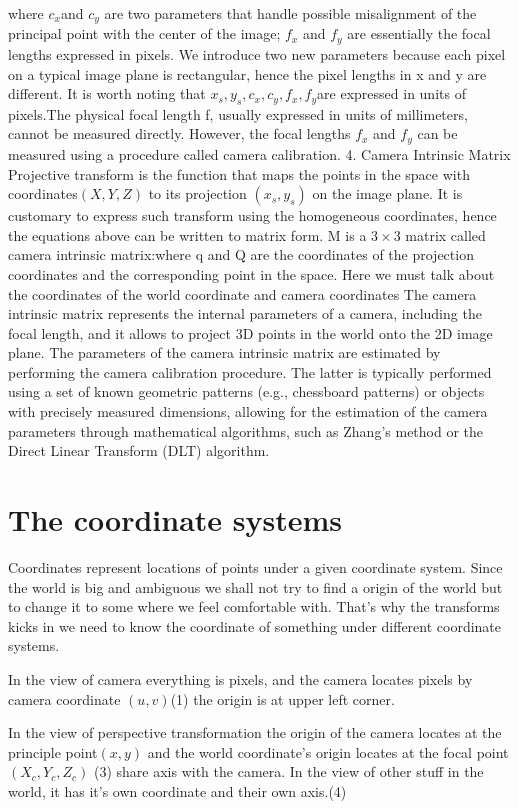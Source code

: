 \documentclass{article}
\begin{document}
where $c_x$and $c_y$
are two parameters that handle possible misalignment of the principal point with the center of the image; $f_x$ and $f_y$
are essentially the focal lengths expressed in pixels. We introduce two new parameters because each pixel on a typical image plane is rectangular, hence the pixel lengths in x and y are different. It is worth noting that $x_s,y_s,c_x,c_y,f_x,f_y$are expressed in units of pixels.The physical focal length f, usually expressed in units of millimeters, cannot be measured directly. However, the focal lengths $f_x$ and $f_y$ can be measured using a procedure called camera calibration.
4. Camera Intrinsic Matrix
Projective transform is the function that maps the points in the space with coordinates$(X, Y, Z)$ to its projection $(x_s, y_s)$ on the image plane. It is customary to express such transform using the homogeneous coordinates, hence the equations above can be written to matrix form.
M is a $3\times3$ matrix called camera intrinsic matrix:where q and Q are the coordinates of the projection coordinates  and the corresponding point in the space.
Here we must talk about the coordinates of the world coordinate and camera coordinates
The camera intrinsic matrix represents the internal parameters of a camera, including the focal length, and it allows to project 3D points in the world onto the 2D image plane.
The parameters of the camera intrinsic matrix are estimated by performing the camera calibration procedure. The latter is typically performed using a set of known geometric patterns (e.g., chessboard patterns) or objects with precisely measured dimensions, allowing for the estimation of the camera parameters through mathematical algorithms, such as Zhang's method or the Direct Linear Transform (DLT) algorithm.
\section{The coordinate systems}
Coordinates represent locations of points under a given coordinate system. Since the world is big and ambiguous we shall not try to find a origin of the world but to change it to some where we feel comfortable with. That's why the transforms kicks in we need to know the coordinate of something under different coordinate systems.

In the view of camera everything is pixels, and the camera locates pixels by camera coordinate $(u,v)$(1) the origin is at upper left corner.

In the view of perspective transformation the origin of the camera locates at the principle
point$(x,y)$ and the world coordinate's origin locates at the focal point$(X_c,Y_c,Z_c)$ (3) share axis with the camera.
In the view of other stuff in the world, it has it's own coordinate and their own axis.(4)
\end{document}

